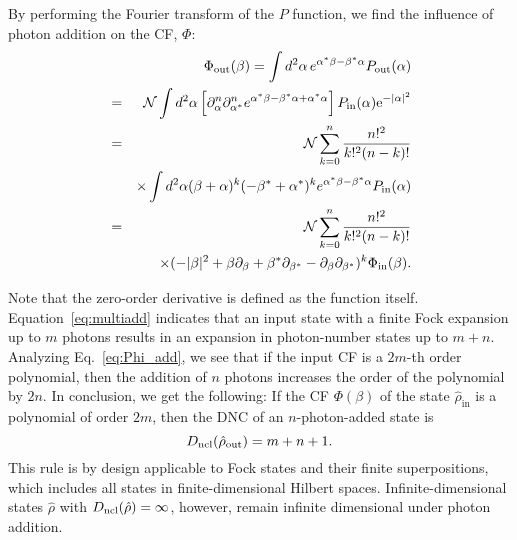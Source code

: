 \documentclass[aps,pra,twocolumn,showpacs,superscriptaddress,10pt]{revtex4-1}
\begin{document}
	By performing the Fourier transform of the $P$ function, we find the influence of photon addition on the CF, $\Phi$:
	\begin{eqnarray}
		\nonumber &&\Phi_{\rm out}(\beta)=\int{d}^2\alpha\,e^{\alpha^{\ast}\beta-\beta^{\ast}\alpha} P_{\rm out}(\alpha)\\
		\nonumber &=&\mathcal{N}\int{d}^2\alpha \left[\partial_{\alpha}^n\partial_{\alpha^\ast}^n{e}^{\alpha^\ast\beta-\beta^{\ast}\alpha+\alpha^{\ast}\alpha}\right]P_{\rm in}(\alpha){\rm e}^{-|\alpha|^2}\\
		\nonumber &=&\mathcal{N}\sum\limits_{k=0}^{n}\frac{n!^2}{k!^2(n-k)!}\\
		\nonumber &&\times\int{d}^2\alpha(\beta+\alpha)^k(-\beta^\ast+\alpha^\ast)^k{e}^{\alpha^\ast\beta-\beta^\ast\alpha}P_{\rm in}(\alpha)\\
		\nonumber &=&\mathcal{N}\sum\limits_{k=0}^{n}\frac{n!^2}{k!^2(n-k)!}\\
		\label{eq:Phi_add} &&\times(-|\beta|^2+\beta\partial_{\beta}+\beta^\ast\partial_{\beta^\ast}-\partial_{\beta}\partial_{\beta^\ast})^k\Phi_{\rm in}(\beta).
	\end{eqnarray}
	
	Note that the zero-order derivative is defined as the function itself.
	Equation~\eqref{eq:multiadd} indicates that an input state with a finite Fock expansion up to $m$ photons results in an expansion in photon-number states up to $m+n$.
	Analyzing Eq.~\eqref{eq:Phi_add}, we see that if the input CF is a $2m$-th order polynomial, then the addition of $n$ photons increases the order of the polynomial by $2n$.
	In conclusion, we get the following:
	If the CF $\Phi(\beta)$ of the state $\hat{\rho}_\mathrm{in}$ is a polynomial of order $2m$, then the DNC of an $n$-photon-added state is
	\begin{equation}
		D_{\rm ncl}(\hat{\rho}_\mathrm{out})= m+n+1. \label{eq:res1}
	\end{equation}
	This rule is by design applicable to Fock states and their finite superpositions, which includes all states in finite-dimensional Hilbert spaces. 
	Infinite-dimensional states $\hat\rho$ with $D_{\rm ncl}(\hat\rho)=\infty$, however, remain infinite dimensional under photon addition.
\end{document}
